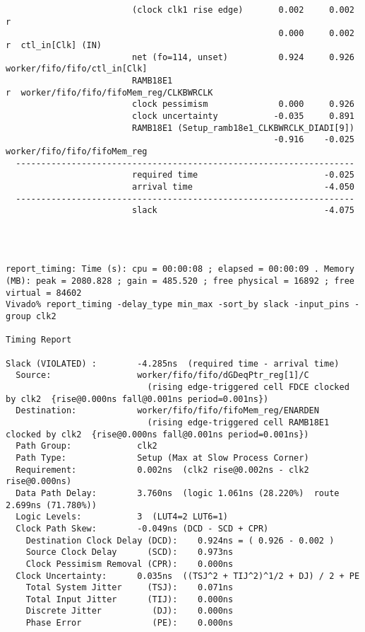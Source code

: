 \documentclass{article}
\begin{document}
\begin{lstlisting}
                         (clock clk1 rise edge)       0.002     0.002 r  
                                                      0.000     0.002 r  ctl_in[Clk] (IN)
                         net (fo=114, unset)          0.924     0.926    worker/fifo/fifo/ctl_in[Clk]
                         RAMB18E1                                     r  worker/fifo/fifo/fifoMem_reg/CLKBWRCLK
                         clock pessimism              0.000     0.926    
                         clock uncertainty           -0.035     0.891    
                         RAMB18E1 (Setup_ramb18e1_CLKBWRCLK_DIADI[9])
                                                     -0.916    -0.025    worker/fifo/fifo/fifoMem_reg
  -------------------------------------------------------------------
                         required time                         -0.025    
                         arrival time                          -4.050    
  -------------------------------------------------------------------
                         slack                                 -4.075    




report_timing: Time (s): cpu = 00:00:08 ; elapsed = 00:00:09 . Memory (MB): peak = 2080.828 ; gain = 485.520 ; free physical = 16892 ; free virtual = 84602
Vivado% report_timing -delay_type min_max -sort_by slack -input_pins -group clk2

Timing Report

Slack (VIOLATED) :        -4.285ns  (required time - arrival time)
  Source:                 worker/fifo/fifo/dGDeqPtr_reg[1]/C
                            (rising edge-triggered cell FDCE clocked by clk2  {rise@0.000ns fall@0.001ns period=0.001ns})
  Destination:            worker/fifo/fifo/fifoMem_reg/ENARDEN
                            (rising edge-triggered cell RAMB18E1 clocked by clk2  {rise@0.000ns fall@0.001ns period=0.001ns})
  Path Group:             clk2
  Path Type:              Setup (Max at Slow Process Corner)
  Requirement:            0.002ns  (clk2 rise@0.002ns - clk2 rise@0.000ns)
  Data Path Delay:        3.760ns  (logic 1.061ns (28.220%)  route 2.699ns (71.780%))
  Logic Levels:           3  (LUT4=2 LUT6=1)
  Clock Path Skew:        -0.049ns (DCD - SCD + CPR)
    Destination Clock Delay (DCD):    0.924ns = ( 0.926 - 0.002 ) 
    Source Clock Delay      (SCD):    0.973ns
    Clock Pessimism Removal (CPR):    0.000ns
  Clock Uncertainty:      0.035ns  ((TSJ^2 + TIJ^2)^1/2 + DJ) / 2 + PE
    Total System Jitter     (TSJ):    0.071ns
    Total Input Jitter      (TIJ):    0.000ns
    Discrete Jitter          (DJ):    0.000ns
    Phase Error              (PE):    0.000ns


\end{lstlisting}
\end{document}
